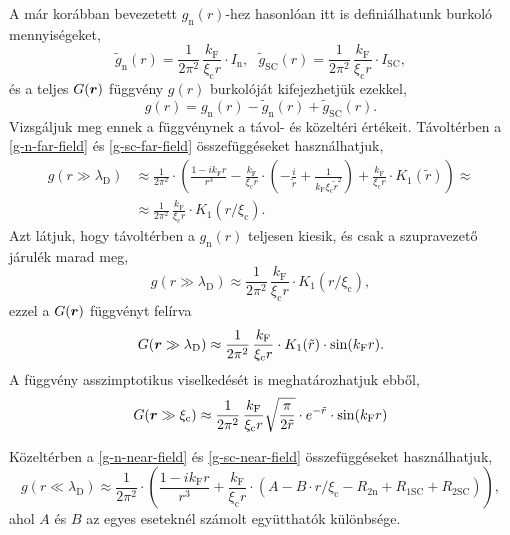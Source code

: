 \documentclass[a4paper,12pt,titlepage]{article}
\newcommand{\RR}{{\vb*{r}}}
\newcommand{\kF}{{k_\text{F}}}
\newcommand{\xic}{{\xi_\text{c}}}
\begin{document}
A már korábban bevezetett $g_\text{n}(r)$-hez hasonlóan itt is definiálhatunk burkoló mennyiségeket,
\begin{equation}
	\tilde{g}_\text{n}(r) = \frac{1}{2 \pi^2} \, \frac{\kF}{\xic r} \cdot I_\text{n}, ~~~
	\tilde{g}_\text{SC}(r) = \frac{1}{2 \pi^2} \, \frac{\kF}{\xic r} \cdot I_\text{SC},
\end{equation}
és a teljes $G(\RR)$ függvény $g(r)$ burkolóját kifejezhetjük ezekkel,
\begin{equation}
	g(r) = g_\text{n}(r) - \tilde{g}_\text{n}(r) + \tilde{g}_\text{SC}(r).
\end{equation}
Vizsgáljuk meg ennek a függvénynek a távol- és közeltéri értékeit.  Távoltérben a \eqref{g-n-far-field} és \eqref{g-sc-far-field} összefüggéseket használhatjuk,
\begin{equation}
\begin{split}
	g(r \gg \lambda_\text{D}) & \approx \frac{1}{2 \pi^2} \cdot \left( \frac{1 - i \kF r}{r^3} - \frac{\kF}{\xic r} \cdot \left( -\frac{i}{\tilde{r}} + \frac{1}{\kF \xic \tilde{r}^2} \right) + \frac{\kF}{\xic r} \cdot K_1(\tilde{r}) \right) \approx \\
	& \approx \frac{1}{2 \pi^2} \, \frac{\kF}{\xic r} \cdot K_1(r / \xic).
\end{split}
\end{equation}
Azt látjuk, hogy távoltérben a $g_\text{n}(r)$ teljesen kiesik, és csak a szupravezető járulék marad meg,
\begin{equation}
	g(r \gg \lambda_\text{D}) \approx \frac{1}{2 \pi^2} \, \frac{\kF}{\xic r} \cdot K_1(r / \xic),
\end{equation}
ezzel a $G(\RR)$ függvényt felírva
\begin{equation}
	G(\RR \gg \lambda_\text{D}) \approx \frac{1}{2 \pi^2} \, \frac{\kF}{\xic r} \cdot K_1(\tilde{r}) \cdot \sin(\kF r).
\end{equation}
A függvény asszimptotikus viselkedését is meghatározhatjuk ebből,
\begin{equation}
	G(\RR \gg \xic) \approx \frac{1}{2 \pi^2} \, \frac{\kF}{\xic r} \sqrt{\frac{\pi}{2 \tilde{r}}} \cdot e^{-\tilde{r}} \cdot \sin(\kF r)
\end{equation}

Közeltérben a \eqref{g-n-near-field} és \eqref{g-sc-near-field} összefüggéseket használhatjuk,
\begin{equation} \label{g-near-field}
	g(r \ll \lambda_\text{D}) \approx \frac{1}{2 \pi^2} \cdot \left( \frac{1 - i \kF r}{r^3} + \frac{\kF}{\xic r} \cdot \left( A - B \cdot r / \xic - R_{2 \text{n}} + R_{1 \text{SC}} + R_{2 \text{SC}} \right) \right),
\end{equation}
ahol $A$ és $B$ az egyes eseteknél számolt együtthatók különbsége.
\end{document}
